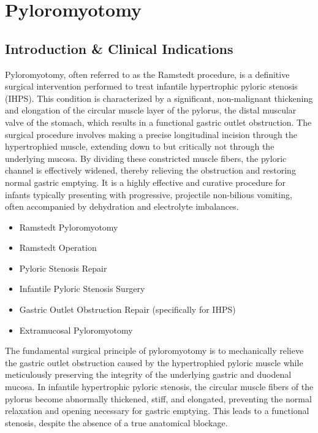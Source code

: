 \chapter{Pyloromyotomy}

\section*{Introduction \& Clinical Indications}
Pyloromyotomy, often referred to as the Ramstedt procedure, is a definitive surgical intervention performed to treat infantile hypertrophic pyloric stenosis (IHPS). This condition is characterized by a significant, non-malignant thickening and elongation of the circular muscle layer of the pylorus, the distal muscular valve of the stomach, which results in a functional gastric outlet obstruction. The surgical procedure involves making a precise longitudinal incision through the hypertrophied muscle, extending down to but critically not through the underlying mucosa. By dividing these constricted muscle fibers, the pyloric channel is effectively widened, thereby relieving the obstruction and restoring normal gastric emptying. It is a highly effective and curative procedure for infants typically presenting with progressive, projectile non-bilious vomiting, often accompanied by dehydration and electrolyte imbalances.

\begin{itemize}
  \item Ramstedt Pyloromyotomy
  \item Ramstedt Operation
  \item Pyloric Stenosis Repair
  \item Infantile Pyloric Stenosis Surgery
  \item Gastric Outlet Obstruction Repair (specifically for IHPS)
  \item Extramucosal Pyloromyotomy
\end{itemize}

The fundamental surgical principle of pyloromyotomy is to mechanically relieve the gastric outlet obstruction caused by the hypertrophied pyloric muscle while meticulously preserving the integrity of the underlying gastric and duodenal mucosa. In infantile hypertrophic pyloric stenosis, the circular muscle fibers of the pylorus become abnormally thickened, stiff, and elongated, preventing the normal relaxation and opening necessary for gastric emptying. This leads to a functional stenosis, despite the absence of a true anatomical blockage.


